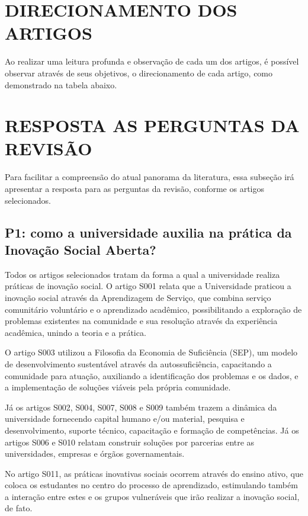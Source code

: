 \section{DIRECIONAMENTO DOS ARTIGOS}

Ao realizar uma leitura profunda e observação de cada um dos artigos, é possível observar através de seus objetivos, o direcionamento de cada artigo, como demonstrado na tabela abaixo.



\section{RESPOSTA AS PERGUNTAS DA REVISÃO}

Para facilitar a compreensão do atual panorama da literatura, essa subseção irá apresentar a resposta para as perguntas da revisão, conforme os artigos selecionados.

\subsection{P1: como a universidade auxilia na prática da Inovação Social Aberta?}

Todos os artigos selecionados tratam da forma a qual a universidade realiza práticas de inovação social. O artigo S001 relata que a Universidade praticou a inovação social através da Aprendizagem de Serviço, que combina serviço comunitário voluntário e o aprendizado acadêmico, possibilitando a exploração de problemas existentes na comunidade e sua resolução através da experiência acadêmica, unindo a teoria e a prática. 

O artigo S003 utilizou a Filosofia da Economia de Suficiência (SEP), um modelo de desenvolvimento sustentável através da autossuficiência, capacitando a comunidade para atuação, auxiliando a identificação dos problemas e os dados, e a implementação de soluções viáveis pela própria comunidade. 

Já os artigos S002, S004, S007, S008 e S009 também trazem a dinâmica da universidade fornecendo capital humano e/ou material, pesquisa e desenvolvimento, suporte técnico, capacitação e formação de competências. Já os artigos S006 e S010 relatam construir soluções por parcerias entre as universidades, empresas e órgãos governamentais.  

No artigo S011, as práticas inovativas sociais ocorrem através do ensino ativo, que coloca os estudantes no centro do processo de aprendizado, estimulando também a interação entre estes e os grupos vulneráveis que irão realizar a inovação social, de fato. 

